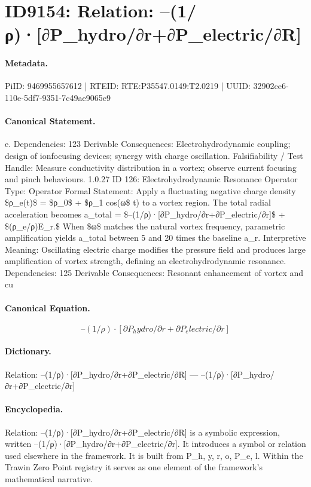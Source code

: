 \section*{ID9154: Relation: –(1/ρ)·[∂P\_hydro/∂r+∂P\_electric/∂R]}
\paragraph{Metadata.}
PiID: 9469955657612 | RTEID: RTE:P35547.0149:T2.0219 | UUID: 32902ce6-110e-5df7-9351-7c49ae9065e9

\paragraph{Canonical Statement.}
e. Dependencies: 123 Derivable Consequences: Electrohydrodynamic coupling; design of ionfocusing devices; synergy with charge oscillation. Falsifiability / Test Handle: Measure conductivity distribution in a vortex; observe current focusing and pinch behaviours. 1.0.27 ID 126: Electrohydrodynamic Resonance Operator Type: Operator Formal Statement: Apply a fluctuating negative charge density \$ρ\_e(t)\$ = \$ρ\_0\$ + \$ρ\_1 cos(ω\$ t) to a vortex region. The total radial acceleration becomes a\_total = \$–(1/ρ)·[∂P\_hydro/∂r+∂P\_electric/∂r]\$ + \$(ρ\_e/ρ)E\_r.\$ When \$ω\$ matches the natural vortex frequency, parametric amplification yields a\_total between 5 and 20 times the baseline a\_r. Interpretive Meaning: Oscillating electric charge modifies the pressure field and produces large amplification of vortex strength, defining an electrohydrodynamic resonance. Dependencies: 125 Derivable Consequences: Resonant enhancement of vortex and cu

\paragraph{Canonical Equation.}
\[
–(1/ρ)·[∂P_hydro/∂r+∂P_electric/∂r]
\]

\paragraph{Dictionary.}
Relation: –(1/ρ)·[∂P\_hydro/∂r+∂P\_electric/∂R] — –(1/ρ)·[∂P\_hydro/∂r+∂P\_electric/∂r]

\paragraph{Encyclopedia.}
Relation: –(1/ρ)·[∂P\_hydro/∂r+∂P\_electric/∂R] is a symbolic expression, written –(1/ρ)·[∂P\_hydro/∂r+∂P\_electric/∂r]. It introduces a symbol or relation used elsewhere in the framework. It is built from P\_h, y, r, o, P\_e, l. Within the Trawin Zero Point registry it serves as one element of the framework's mathematical narrative.
